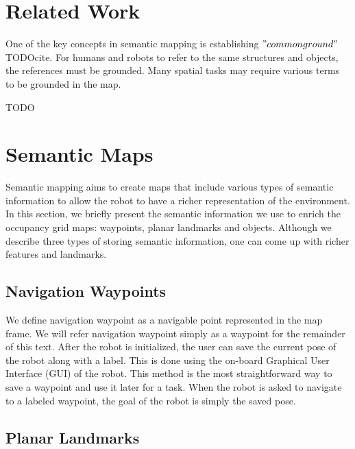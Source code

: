 \documentclass[12pt]{gatech-thesis}
\begin{document}
\section{Related Work}
\label{sec:map_relevant_work}


One of the key concepts in semantic mapping is establishing $"common ground"$ TODOcite. For humans and robots to refer to the same structures and objects, the references must be grounded. Many spatial tasks may require various terms to be grounded in the map.

TODO


\section{Semantic Maps}
\label{sec:map_semantic_maps}

Semantic mapping aims to create maps that include various types of semantic information to allow the robot to have a richer representation of the environment. In this section, we briefly present the semantic information we use to enrich the occupancy grid maps: waypoints, planar landmarks and objects. Although we describe three types of storing semantic information, one can come up with richer features and landmarks.

\subsection{Navigation Waypoints}
\label{sec:map_waypoints}

We define navigation waypoint as a navigable point represented in the map frame. We will refer navigation waypoint simply as a waypoint for the remainder of this text. After the robot is initialized, the user can save the current pose of the robot along with a label. This is done using the on-board Graphical User Interface (GUI) of the robot. This method is the most straightforward way to save a waypoint and use it later for a task. When the robot is asked to navigate to a labeled waypoint, the goal of the robot is simply the saved pose.



\subsection{Planar Landmarks}
\label{sec:map_landmarks}
\end{document}
